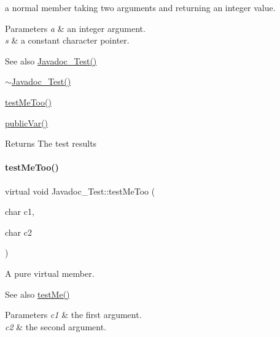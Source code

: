 a normal member taking two arguments and returning an integer value. 


\begin{DoxyParams}{Parameters}
{\em a} & an integer argument. \\
\hline
{\em s} & a constant character pointer. \\
\hline
\end{DoxyParams}
\begin{DoxySeeAlso}{See also}
\hyperlink{class_javadoc___test_a17313327932ae97596b0a455ba8342cc}{Javadoc\+\_\+\+Test()} 

\hyperlink{class_javadoc___test_a60016cd15a4ed82bbc35be79a0a6a6b5}{$\sim$\+Javadoc\+\_\+\+Test()} 

\hyperlink{class_javadoc___test_ac2b39cabbe80957ae3e8bc2bd4e887f6}{test\+Me\+Too()} 

\hyperlink{class_javadoc___test_a44a516fbc3a4865e2dcae34649c9df6a}{public\+Var()} 
\end{DoxySeeAlso}
\begin{DoxyReturn}{Returns}
The test results 
\end{DoxyReturn}
\hypertarget{class_javadoc___test_ac2b39cabbe80957ae3e8bc2bd4e887f6}{}\label{class_javadoc___test_ac2b39cabbe80957ae3e8bc2bd4e887f6} 
\paragraph{\texorpdfstring{test\+Me\+Too()}{testMeToo()}}
{\footnotesize\ttfamily virtual void Javadoc\+\_\+\+Test\+::test\+Me\+Too (\begin{DoxyParamCaption}\item[{char}]{c1,  }\item[{char}]{c2 }\end{DoxyParamCaption})\hspace{0.3cm}{\ttfamily [pure virtual]}}



A pure virtual member. 

\begin{DoxySeeAlso}{See also}
\hyperlink{class_javadoc___test_a0c472683ed25ff096e8a9edfb18d550c}{test\+Me()} 
\end{DoxySeeAlso}

\begin{DoxyParams}{Parameters}
{\em c1} & the first argument. \\
\hline
{\em c2} & the second argument. \\
\hline
\end{DoxyParams}


